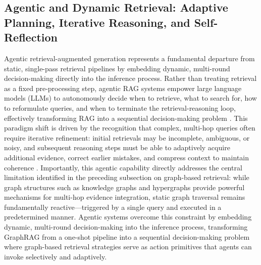 \documentclass[11pt]{article}
\begin{document}
\subsection{Agentic and Dynamic Retrieval: Adaptive Planning, Iterative Reasoning, and Self-Reflection}

Agentic retrieval-augmented generation represents a fundamental departure from static, single-pass retrieval pipelines by embedding dynamic, multi-round decision-making directly into the inference process. Rather than treating retrieval as a fixed pre-processing step, agentic RAG systems empower large language models (LLMs) to autonomously decide when to retrieve, what to search for, how to reformulate queries, and when to terminate the retrieval-reasoning loop, effectively transforming RAG into a sequential decision-making problem \cite{ref25}. This paradigm shift is driven by the recognition that complex, multi-hop queries often require iterative refinement: initial retrievals may be incomplete, ambiguous, or noisy, and subsequent reasoning steps must be able to adaptively acquire additional evidence, correct earlier mistakes, and compress context to maintain coherence \cite{ref305,ref170}. Importantly, this agentic capability directly addresses the central limitation identified in the preceding subsection on graph-based retrieval: while graph structures such as knowledge graphs and hypergraphs provide powerful mechanisms for multi-hop evidence integration, static graph traversal remains fundamentally reactive---triggered by a single query and executed in a predetermined manner. Agentic systems overcome this constraint by embedding dynamic, multi-round decision-making into the inference process, transforming GraphRAG from a one-shot pipeline into a sequential decision-making problem where graph-based retrieval strategies serve as action primitives that agents can invoke selectively and adaptively.
\end{document}
